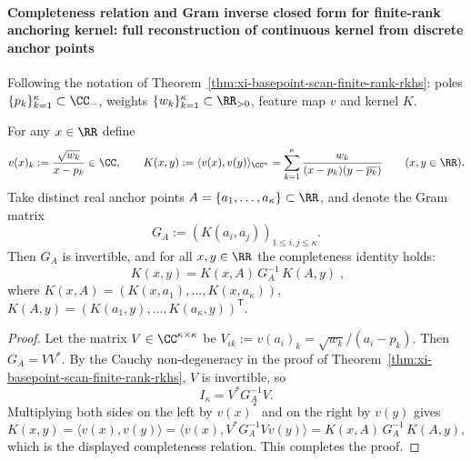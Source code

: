 
\paragraph{Completeness relation and Gram inverse closed form for finite-rank anchoring kernel: full reconstruction of continuous kernel from discrete anchor points}
Following the notation of Theorem~\ref{thm:xi-basepoint-scan-finite-rank-rkhs}: poles \(\{p_k\}_{k=1}^{\kappa}\subset\CC_{-}\), weights \(\{w_k\}_{k=1}^{\kappa}\subset\RR_{>0}\), feature map \(v\) and kernel \(K\).

\begin{proposition}\label{prop:xi-basepoint-scan-kernel-completeness-full-rank}
For any \(x\in\RR\) define
\[
v(x)_k:=\frac{\sqrt{w_k}}{x-p_k}\in\CC,\qquad
K(x,y):=\langle v(x),v(y)\rangle_{\CC^\kappa}
=\sum_{k=1}^{\kappa}\frac{w_k}{(x-p_k)(y-\overline{p_k})}\qquad(x,y\in\RR).
\]
Take distinct real anchor points \(A=\{a_1,\dots,a_\kappa\}\subset\RR\), and denote the Gram matrix
\[
G_A:=(K(a_i,a_j))_{1\le i,j\le \kappa}.
\]
Then \(G_A\) is invertible, and for all \(x,y\in\RR\) the completeness identity holds:
\[
\boxed{\;
K(x,y)=K(x,A)\,G_A^{-1}\,K(A,y)\; },
\]
where
\(
K(x,A)=(K(x,a_1),\dots,K(x,a_\kappa))
\),
\(
K(A,y)=(K(a_1,y),\dots,K(a_\kappa,y))^{\mathsf T}
\).
\end{proposition}
\begin{proof}
Let the matrix \(V\in\CC^{\kappa\times\kappa}\) be
\(
V_{ik}:=v(a_i)_k=\sqrt{w_k}/(a_i-p_k)
\).
Then \(G_A=VV^\ast\).
By the Cauchy non-degeneracy in the proof of Theorem~\ref{thm:xi-basepoint-scan-finite-rank-rkhs}, \(V\) is invertible, so
\[
I_\kappa=V^\ast G_A^{-1}V.
\]
Multiplying both sides on the left by \(v(x)^\ast\) and on the right by \(v(y)\) gives
\[
K(x,y)
=\langle v(x),v(y)\rangle
=\langle v(x),V^\ast G_A^{-1}Vv(y)\rangle
=K(x,A)\,G_A^{-1}\,K(A,y),
\]
which is the displayed completeness relation. This completes the proof.
\end{proof}

